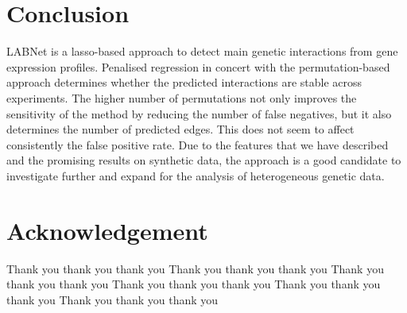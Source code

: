 \section{Conclusion} \label{conclusion}
LABNet is a lasso-based approach to detect main genetic interactions from gene expression profiles.  Penalised regression in concert with the permutation-based approach determines whether the predicted interactions are stable across experiments. 
The higher number of permutations not only improves the sensitivity of the method by reducing the number of false negatives, but it also determines the number of predicted edges. This does not seem to affect consistently the false positive rate. Due to the features that we have described and the promising results on synthetic data, the approach is a good candidate to investigate further and expand for the analysis of heterogeneous genetic data. 

\section*{Acknowledgement}
Thank you thank you thank you Thank you thank you thank you Thank you thank you thank you 
Thank you thank you thank you Thank you thank you thank you Thank you thank you thank you 
